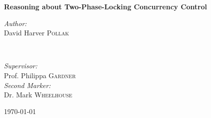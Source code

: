 \begin{titlepage}
\vspace*{\fill}
    \begin{center}
        \huge
        \textbf{Reasoning about Two-Phase-Locking Concurrency Control}
        
        \vspace{1.5cm}
        
        \begin{minipage}{0.4\textwidth}
			\begin{flushleft} \large
				\emph{Author:}\\
				David Harver \textsc{Pollak}
			\end{flushleft}
		\end{minipage}
			~
		\begin{minipage}{0.4\textwidth}
			\begin{flushright} \large
			\emph{Supervisor:} \\
			Prof. Philippa \textsc{Gardner} \\
			\vspace{0.5cm}
			\emph{Second Marker:} \\
			Dr. Mark \textsc{Wheelhouse}
			\end{flushright}
		\end{minipage}
		
		 \vspace{1.5cm}
		
		{\large \today}
    \end{center}
\vspace*{\fill}
\end{titlepage}